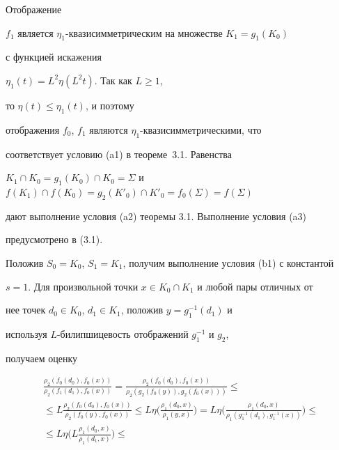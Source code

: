 \begin{pf}


Отображение 


$f_1$ является $\eta_1$-{}квазисимметрическим на множестве $K_1=g_1(K_0)$ 


с функцией искажения 


$\eta_1(t)=L^2 \eta(L^2t)$. Так как $L\geq 1$, 


то $\eta(t) \leq \eta_1(t)$, и поэтому 


отображения $f_0$, $f_1$ являются $\eta_1$-{}квазисимметрическими, что 


соответствует условию (a1) в теореме~3.1. Равенства 


$K_1 \cap K_0=g_1(K_0) \cap K_0=


\Sigma$ и $f(K_1)\cap f(K_0)=g_2(K'_0)\cap K'_0=f_0(\Sigma)=f(\Sigma)$ 


дают выполнение условия (a2) теоремы 3.1. Выполнение условия (a3) 


предусмотрено в (3.1). 


Положив $S_0=K_0$, $S_1=K_1$, получим выполнение условия (b1) с константой 


$s=1$. Для произвольной точки $x\in K_0\cap K_1$ и любой пары отличных от 


нее точек $d_0\in K_0$, $d_1\in 


K_1$, положив $y=g_1^{-1}(d_1)$ и 


используя $L$-билипшицевость отображений $g_1^{-1}$ и $g_2$, 


получаем оценку


\begin{multline*}  %


\frac{\rho_2(f_0(d_0), f_0(x))}{\rho_2(f_1(d_1), f_0(x))}=


\frac{\rho_2(f_0(d_0), f_0(x))}


{\rho_2(g_2(f_0(y)), g_2(f_0(x)))} \leq \\


%


\leq L \frac{\rho_2(f_0(d_0), f_0(x))}{ \rho_2( f_0(y), f_0(x))} \leq 


L \eta \bigg( \frac{\rho_1( d_0, x)}{\rho_1(y,x)}\bigg)=


L\eta\bigg( \frac{\rho_1(d_0,x)}{\rho_1(g_1^{-1}(d_1), g_1^{-1}(x))} 


\bigg) \leq\\


%


\leq L\eta \bigg( L \frac{\rho_1(d_0, x)}{\rho_1(d_1, x)} \bigg) \leq 



\end{multline*}
\end{pf}
